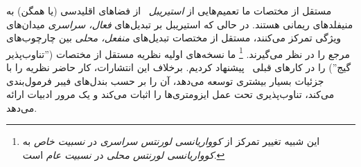  مستقل از مختصات ما تعمیم‌هایی از \emph{ استیریبل}~\cite{Cohen2017-STEER,3d_steerableCNNs,Weiler2019_E2CNN,Cohen2019-generaltheory,lang2020WignerEckart} از فضاهای اقلیدسی (یا همگن) به منیفلدهای ریمانی هستند.
در حالی که  استیریبل بر تبدیل‌های \emph{فعال، سراسری} میدان‌های ویژگی تمرکز می‌کنند،  مستقل از مختصات تبدیل‌های \emph{منفعل، محلی} بین چارچوب‌های مرجع را در نظر می‌گیرند.%
\footnote{
	این شبیه تغییر تمرکز از \emph{کوواریانسی لورنتس سراسری} در \emph{نسبیت خاص} به \emph{کوواریانسی لورنتس محلی} در \emph{نسبیت عام} است.
}
ما نسخه‌های اولیه نظریه  مستقل از مختصات ('' تناوب‌پذیر گیج'') را در کارهای قبلی~\cite{gaugeIco2019,deHaan2020meshCNNs} پیشنهاد کردیم.
برخلاف این انتشارات، کار حاضر نظریه را با جزئیات بسیار بیشتری توسعه می‌دهد، آن را بر حسب بندل‌های فیبر فرمول‌بندی می‌کند، تناوب‌پذیری تحت عمل ایزومتری‌ها را اثبات می‌کند و یک مرور ادبیات ارائه می‌دهد.